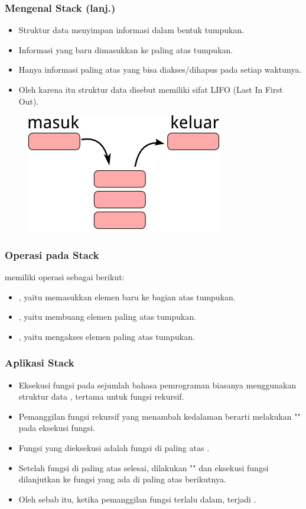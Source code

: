 \begin{frame}
\frametitle{Mengenal Stack (lanj.)}
\begin{itemize}
  \item Struktur data  menyimpan informasi dalam bentuk tumpukan.
  \item Informasi yang baru dimasukkan ke paling atas tumpukan.
  \item Hanya informasi paling atas yang bisa diakses/dihapus pada setiap waktunya.
  \item Oleh karena itu struktur data  disebut memiliki sifat LIFO (Last In First Out).
\end{itemize}
\begin{figure}
  \centering
  \includegraphics[width=4 cm]{asset/stack.png}
\end{figure}
\end{frame}

\begin{frame}
\frametitle{Operasi pada Stack}

 memiliki operasi sebagai berikut:
\begin{itemize}
  \item {}, yaitu memasukkan elemen baru ke bagian atas tumpukan.
  \item {}, yaitu membuang elemen paling atas tumpukan.
  \item {}, yaitu mengakses elemen paling atas tumpukan.
\end{itemize}
\end{frame}

\begin{frame}
\frametitle{Aplikasi Stack}
\begin{itemize}
  \item Eksekusi fungsi pada sejumlah bahasa pemrograman biasanya menggunakan struktur data , tertama untuk fungsi rekursif.
  \item Pemanggilan fungsi rekursif yang menambah kedalaman berarti melakukan "" pada  eksekusi fungsi.
  \item Fungsi yang dieksekusi adalah fungsi di paling atas .
  \item Setelah fungsi di paling atas selesai, dilakukan "" dan eksekusi fungsi dilanjutkan ke fungsi yang ada di paling atas  berikutnya.
  \item Oleh sebab itu, ketika pemanggilan fungsi terlalu dalam, terjadi .
\end{itemize}
\end{frame}


